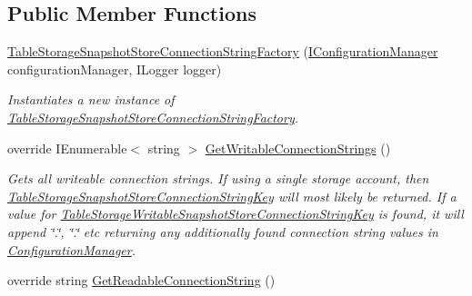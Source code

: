\subsection*{Public Member Functions}
\begin{DoxyCompactItemize}
\item 
\hyperlink{classCqrs_1_1Azure_1_1BlobStorage_1_1Events_1_1TableStorageSnapshotStoreConnectionStringFactory_adf49df18fd687cf39ee1c389c338e364_adf49df18fd687cf39ee1c389c338e364}{Table\+Storage\+Snapshot\+Store\+Connection\+String\+Factory} (\hyperlink{interfaceCqrs_1_1Configuration_1_1IConfigurationManager}{I\+Configuration\+Manager} configuration\+Manager, I\+Logger logger)
\begin{DoxyCompactList}\small\item\em Instantiates a new instance of \hyperlink{classCqrs_1_1Azure_1_1BlobStorage_1_1Events_1_1TableStorageSnapshotStoreConnectionStringFactory}{Table\+Storage\+Snapshot\+Store\+Connection\+String\+Factory}. \end{DoxyCompactList}\item 
override I\+Enumerable$<$ string $>$ \hyperlink{classCqrs_1_1Azure_1_1BlobStorage_1_1Events_1_1TableStorageSnapshotStoreConnectionStringFactory_a78f9987855e2c4c370c624b0edb97f4d_a78f9987855e2c4c370c624b0edb97f4d}{Get\+Writable\+Connection\+Strings} ()
\begin{DoxyCompactList}\small\item\em Gets all writeable connection strings. If using a single storage account, then \hyperlink{classCqrs_1_1Azure_1_1BlobStorage_1_1Events_1_1TableStorageSnapshotStoreConnectionStringFactory_aeb34e21116be39f3f34e5970001f3762_aeb34e21116be39f3f34e5970001f3762}{Table\+Storage\+Snapshot\+Store\+Connection\+String\+Key} will most likely be returned. If a value for \hyperlink{classCqrs_1_1Azure_1_1BlobStorage_1_1Events_1_1TableStorageSnapshotStoreConnectionStringFactory_a7bb0a4b42242b523df90611e8c28a4e6_a7bb0a4b42242b523df90611e8c28a4e6}{Table\+Storage\+Writable\+Snapshot\+Store\+Connection\+String\+Key} is found, it will append \char`\"{}.\char`\"{}, \char`\"{}.\char`\"{} etc returning any additionally found connection string values in \hyperlink{namespaceCqrs_1_1Azure_1_1ConfigurationManager}{Configuration\+Manager}. \end{DoxyCompactList}\item 
override string \hyperlink{classCqrs_1_1Azure_1_1BlobStorage_1_1Events_1_1TableStorageSnapshotStoreConnectionStringFactory_a092e6f4132d8cb0c1b25e0c19a3911ba_a092e6f4132d8cb0c1b25e0c19a3911ba}{Get\+Readable\+Connection\+String} ()

\end{DoxyCompactItemize}
